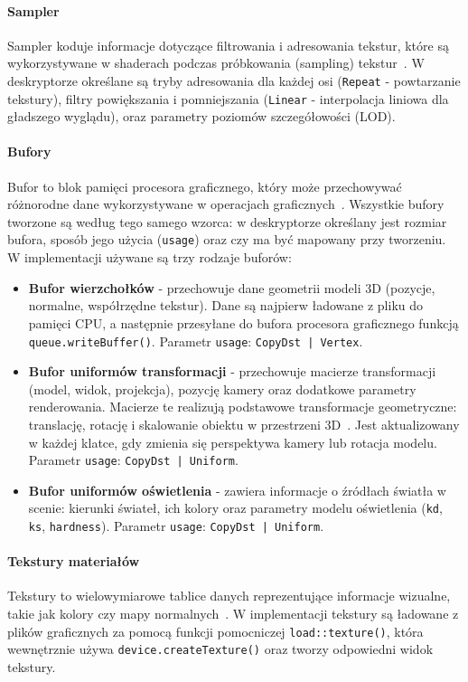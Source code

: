 \paragraph{Sampler}
Sampler koduje informacje dotyczące filtrowania i adresowania tekstur, które są wykorzystywane w shaderach podczas próbkowania (sampling) tekstur~\cite{WebGPU-draft}. W deskryptorze określane są tryby adresowania dla każdej osi (\texttt{Repeat} - powtarzanie tekstury), filtry powiększania i pomniejszania (\texttt{Linear} - interpolacja liniowa dla gładszego wyglądu), oraz parametry poziomów szczegółowości (LOD).

\paragraph{Bufory}
Bufor to blok pamięci procesora graficznego, który może przechowywać różnorodne dane wykorzystywane w operacjach graficznych~\cite{WebGPU-draft}. Wszystkie bufory tworzone są według tego samego wzorca: w deskryptorze określany jest rozmiar bufora, sposób jego użycia (\texttt{usage}) oraz czy ma być mapowany przy tworzeniu. W implementacji używane są trzy rodzaje buforów:
\begin{itemize}
  \item \textbf{Bufor wierzchołków} - przechowuje dane geometrii modeli 3D (pozycje, normalne, współrzędne tekstur). Dane są najpierw ładowane z pliku do pamięci CPU, a następnie przesyłane do bufora procesora graficznego funkcją \texttt{queue.writeBuffer()}. Parametr \texttt{usage}: \texttt{CopyDst | Vertex}.
  \item \textbf{Bufor uniformów transformacji} - przechowuje macierze transformacji (model, widok, projekcja), pozycję kamery oraz dodatkowe parametry renderowania. Macierze te realizują podstawowe transformacje geometryczne: translację, rotację i skalowanie obiektu w przestrzeni 3D~\cite{ji2025}. Jest aktualizowany w każdej klatce, gdy zmienia się perspektywa kamery lub rotacja modelu. Parametr \texttt{usage}: \texttt{CopyDst | Uniform}.
  \item \textbf{Bufor uniformów oświetlenia} - zawiera informacje o źródłach światła w scenie: kierunki świateł, ich kolory oraz parametry modelu oświetlenia (\texttt{kd}, \texttt{ks}, \texttt{hardness}). Parametr \texttt{usage}: \texttt{CopyDst | Uniform}.
\end{itemize}

\paragraph{Tekstury materiałów}
Tekstury to wielowymiarowe tablice danych reprezentujące informacje wizualne, takie jak kolory czy mapy normalnych~\cite{WebGPU-draft}. W implementacji tekstury są ładowane z plików graficznych za pomocą funkcji pomocniczej \texttt{load::texture()}, która wewnętrznie używa \texttt{device.createTexture()} oraz tworzy odpowiedni widok tekstury.

